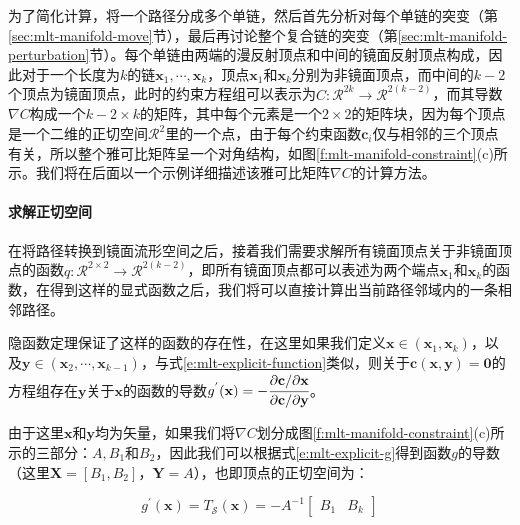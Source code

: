 为了简化计算，\cite{a:ManifoldExplorationAMarkovChainMonteCarloTechniqueforRenderingSceneswithDifficultSpecularTransport}将一个路径分成多个单链，然后首先分析对每个单链的突变（第\ref{sec:mlt-manifold-move}节），最后再讨论整个复合链的突变（第\ref{sec:mlt-manifold-perturbation}节）。每个单链由两端的漫反射顶点和中间的镜面反射顶点构成，因此对于一个长度为$k$的链$\mathbf{x}_1,\cdots,\mathbf{x}_k$，顶点$\mathbf{x}_1$和$\mathbf{x}_k$分别为非镜面顶点，而中间的$k-2$个顶点为镜面顶点，此时的约束方程组可以表示为$C:\mathcal{R}^{2k}\to\mathcal{R}^{2(k-2)}$，而其导数$\nabla C$构成一个$k-2\times k$的矩阵，其中每个元素是一个$2\times 2$的矩阵块，因为每个顶点是一个二维的正切空间$\mathcal{R}^{2}$里的一个点，由于每个约束函数$\mathbf{c}_i$仅与相邻的三个顶点有关，所以整个雅可比矩阵呈一个对角结构，如图\ref{f:mlt-manifold-constraint}(c)所示。我们将在后面以一个示例详细描述该雅可比矩阵$\nabla C$的计算方法。




\paragraph{求解正切空间}
在将路径转换到镜面流形空间之后，接着我们需要求解所有镜面顶点关于非镜面顶点的函数$q:\mathcal{R}^{2\times 2}\to\mathcal{R}^{2(k-2)}$，即所有镜面顶点都可以表述为两个端点$\mathbf{x}_1$和$\mathbf{x}_k$的函数，在得到这样的显式函数之后，我们将可以直接计算出当前路径邻域内的一条相邻路径。

隐函数定理保证了这样的函数的存在性，在这里如果我们定义$\mathbf{x}\in (\mathbf{x}_1,\mathbf{x}_k)$，以及$\mathbf{y}\in (\mathbf{x}_2,\cdots,\mathbf{x}_{k-1})$，与式\ref{e:mlt-explicit-function}类似，则关于$\mathbf{c}(\mathbf{x},\mathbf{y})=\mathbf{0}$的方程组存在$\mathbf{y}$关于$\mathbf{x}$的函数的导数$g^{'}(\mathbf{x})=-\cfrac{{\rm \partial} \mathbf{c}/{\rm \partial} \mathbf{x}}{{\rm \partial} \mathbf{c}/{\rm \partial} \mathbf{y}}$。

由于这里$\mathbf{x}$和$\mathbf{y}$均为矢量，如果我们将$\nabla C$划分成图\ref{f:mlt-manifold-constraint}(c)所示的三部分：$A,B_1$和$B_2$，因此我们可以根据式\ref{e:mlt-explicit-g}得到函数$g$的导数（这里$\mathbf{X}=[B_1,B_2]$，$\mathbf{Y}=A$），也即顶点的正切空间为：

\begin{equation}
	g^{'}({\mathbf{x}})=T_{\mathcal{S}}({\mathbf{x}})=-A^{-1}\begin{bmatrix}
		B_1 &B_k
	\end{bmatrix}
\end{equation}


